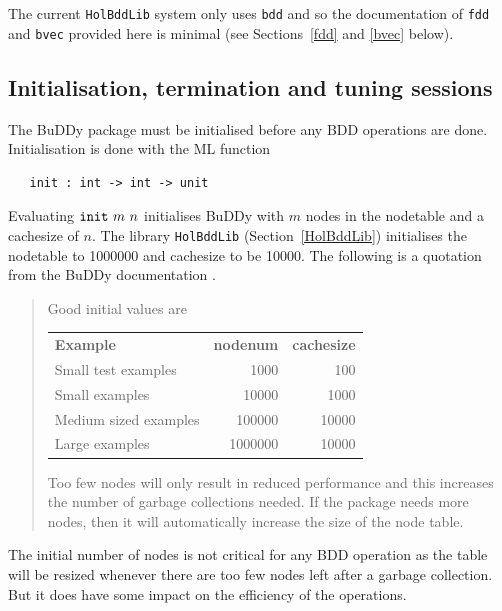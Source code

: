 \documentclass[12pt,fleqn]{article}
\renewcommand{\t}[1]{\mbox{\tt #1}}
\newcommand{\Buddy}{BuDDy{}}
\newcommand\HolBuddy{\texttt{HolBddLib}{}}
\begin{document}
The current \HolBuddy{} system only uses \t{bdd} and so
the documentation of \t{fdd} and \t{bvec} provided here is minimal
(see Sections~\ref{fdd} and \ref{bvec} below).

\subsection{Initialisation, termination and tuning sessions}\label{init}

The \Buddy{} package must be initialised before any BDD operations are done.
Initialisation is done with the ML function

\begin{verbatim}
   init : int -> int -> unit
\end{verbatim}

Evaluating $\t{init}~m~n$ initialises \Buddy{} with $m$ nodes in the
nodetable and a cachesize of $n$.
The library \t{HolBddLib} (Section~\ref{HolBddLib})
initialises the nodetable to 1000000 and cachesize to
be 10000. The following is a quotation from the \Buddy{} documentation \cite{BuDDy}.

\vspace*{-2mm}

{\baselineskip8pt\begin{quote}\footnotesize
Good initial values are

\smallskip

\begin{tabular}{lrr}
{\bf Example} & {\bf nodenum} & {\bf cachesize} \\
Small test examples   & 1000    & 100\\
Small examples        & 10000   & 1000 \\
Medium sized examples & 100000  & 10000\\
Large examples        & 1000000 & 10000
\end{tabular}

\smallskip

Too few nodes will only result in reduced performance and this
increases the number of garbage collections needed. If the package
needs more nodes, then it will automatically increase the size of the
node table.
\end{quote}}

The initial number of nodes is not critical for any BDD operation
as the table will be resized whenever there are too few nodes left
after a garbage collection.  But it does have some impact on the
efficiency of the operations.
\end{document}
